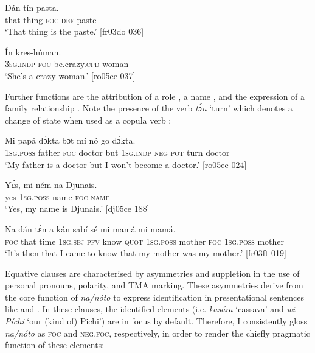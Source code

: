 \ea%
    \label{ex:key:761}
    \gll Dán    tín       pasta.\\
that    thing  \textsc{foc}  \textsc{def}  paste\\

\glt ‘That thing is the paste.’ [fr03do 036]
\z


\ea%
    \label{ex:key:762}
    \gll \'{I}n     kres-húman.\\
\textsc{3sg.indp}  \textsc{foc}  be.crazy.\textsc{cpd}{}-woman\\

\glt ‘She’s a crazy woman.’ [ro05ee 037]
\z

Further functions are the attribution of a role , a name , and the expression of a family relationship . Note the presence of the verb \textit{tɔ́n} ‘turn’ which denotes a change of state when used as a copula verb : 


\ea%
    \label{ex:key:763}
    \gll Mi    papá   dɔ́kta  bɔt  mí    nó  go    dɔ́kta.\\
\textsc{1sg.poss}  father  \textsc{foc}  doctor  but  \textsc{1sg.indp}  \textsc{neg}  \textsc{pot}  turn  doctor\\

\glt ‘My father is a doctor but I won’t become a doctor.’ [ro05ee 024]
\z


\ea%
    \label{ex:key:764}
    \gll Yɛ́s,  mi    ném    na  Djunais.\\
yes  \textsc{1sg.poss}  name  \textsc{foc}  \textsc{name}\\

\glt ‘Yes, my name is Djunais.’ [dj05ce 188]
\z


\ea%
    \label{ex:key:765}
    \gll Na  dán  tɛ́n  a    kán  sabí    sé    mi    mamá 
 mi    mamá.\\
\textsc{foc}  that  time  \textsc{1sg.sbj}  \textsc{pfv}  know  \textsc{quot}    \textsc{1sg.poss}  mother 
\textsc{foc}  \textsc{1sg.poss}  mother\\

\glt ‘It’s then that I came to know that my mother was my mother.’ [fr03ft 019]
\z

Equative clauses are characterised by asymmetries and suppletion in the use of personal pronouns, polarity, and \textsc{TMA} marking. These asymmetries derive from the core function of \textit{na}\textit{\textup{/}}\textit{nóto} to express identification in presentational sentences like  and . In these clauses, the identified elements (i.e. \textit{kasára} ‘cassava’ and \textit{wi Píchi} ‘our (kind of) Pichi’) are in focus by default. Therefore, I consistently gloss \textit{na}\textit{\textup{/}}\textit{nóto} as \textsc{foc} and \textsc{neg.foc,} respectively, in order to render the chiefly pragmatic function of these elements: 


